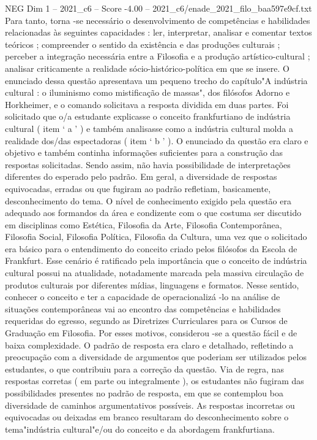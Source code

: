 \begin{textsample}{NEG Dim 1 – 2021\_c6 – Score -4.00 – 2021\_c6/enade\_2021\_filo\_baa597e9cf.txt}
Para tanto, torna -se necessário o desenvolvimento de competências e habilidades relacionadas às seguintes capacidades : ler, interpretar, analisar e comentar textos teóricos ; compreender o sentido da existência e das produções culturais ; perceber a integração necessária entre a Filosofia e a produção artístico-cultural ; analisar criticamente a realidade sócio-histórico-política em que se insere.
O enunciado dessa questão apresentava um pequeno trecho do capítulo"A indústria cultural : o iluminismo como mistificação de massas", dos filósofos Adorno e Horkheimer, e o comando solicitava a resposta dividida em duas partes.
Foi solicitado que o/a estudante explicasse o conceito frankfurtiano de indústria cultural ( item ‘ a ’ ) e também analisasse como a indústria cultural molda a realidade dos/das espectadoras ( item ‘ b ’ ).
O enunciado da questão era claro e objetivo e também continha informações suficientes para a construção das respostas solicitadas.
Sendo assim, não havia possibilidade de interpretações diferentes do esperado pelo padrão.
Em geral, a diversidade de respostas equivocadas, erradas ou que fugiram ao padrão refletiam, basicamente, desconhecimento do tema.
O nível de conhecimento exigido pela questão era adequado aos formandos da área e condizente com o que costuma ser discutido em disciplinas como Estética, Filosofia da Arte, Filosofia Contemporânea, Filosofia Social, Filosofia Política, Filosofia da Cultura, uma vez que o solicitado era básico para o entendimento do conceito criado pelos filósofos da Escola de Frankfurt.
Esse cenário é ratificado pela importância que o conceito de indústria cultural possui na atualidade, notadamente marcada pela massiva circulação de produtos culturais por diferentes mídias, linguagens e formatos.
Nesse sentido, conhecer o conceito e ter a capacidade de operacionalizá -lo na análise de situações contemporâneas vai ao encontro das competências e habilidades requeridas do egresso, segundo as Diretrizes Curriculares para os Cursos de Graduação em Filosofia.
Por esses motivos, considerou -se a questão fácil e de baixa complexidade.
O padrão de resposta era claro e detalhado, refletindo a preocupação com a diversidade de argumentos que poderiam ser utilizados pelos estudantes, o que contribuiu para a correção da questão.
Via de regra, nas respostas corretas ( em parte ou integralmente ), os estudantes não fugiram das possibilidades presentes no padrão de resposta, em que se contemplou boa diversidade de caminhos argumentativos possíveis.
As respostas incorretas ou equivocadas ou deixadas em branco resultaram do desconhecimento sobre o tema"indústria cultural"e/ou do conceito e da abordagem frankfurtiana.

\end{textsample}
